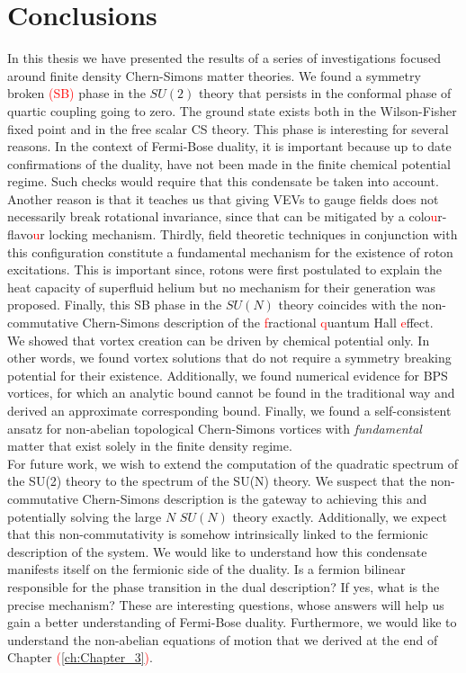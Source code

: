 
\chapter*{Conclusions}

    In this thesis we have presented the results of a series of investigations focused around finite density Chern-Simons matter theories. We found a symmetry broken \textcolor{red}{(SB)} phase in the $SU(2)$ theory that persists in the conformal phase of quartic coupling going to zero. The ground state exists both in the Wilson-Fisher fixed point and in the free scalar CS theory. This phase is interesting for several reasons. In the context of Fermi-Bose duality, it is important because up to date confirmations of the duality, have not been made in the finite chemical potential regime. Such checks would require that this condensate be taken into account. Another reason is that it teaches us that giving VEVs to gauge fields does not necessarily break rotational invariance, since that can be mitigated by a colo\textcolor{red}{u}r-flavo\textcolor{red}{u}r locking mechanism. Thirdly, field theoretic techniques in conjunction with this configuration constitute a fundamental mechanism for the existence of roton excitations. This is important since, rotons were first postulated to explain the heat capacity of superfluid helium \textcolor{red}{\cite{PhysRev.60.356}} but no mechanism for their generation was proposed. Finally, this SB phase in the $SU(N)$ theory coincides with the non-commutative Chern-Simons description of the \textcolor{red}{f}ractional \textcolor{red}{q}uantum Hall \textcolor{red}{e}ffect.\\
    \indent We showed that vortex creation can be driven by chemical potential only. In other words, we found vortex solutions that do not require a symmetry breaking potential for their existence. Additionally, we found numerical evidence for BPS vortices, for which an analytic bound cannot be found in the traditional way and derived an approximate corresponding bound. Finally, we found a self-consistent ansatz for non-abelian topological Chern-Simons vortices with \textit{fundamental} matter that exist solely in the finite density regime.\\
    \indent For future work, we wish to extend the computation of the quadratic spectrum of the SU(2) theory to the spectrum of the SU(N) theory. We suspect that the non-commutative Chern-Simons description is the gateway to achieving this and potentially solving the large $N$ $SU(N)$ theory exactly. Additionally, we expect that this non-commutativity is somehow intrinsically linked to the fermionic description of the system. We would like to understand how this condensate manifests itself on the fermionic side of the duality. Is a fermion bilinear responsible for the phase transition in the dual description? If yes, what is the precise mechanism? These are interesting questions, whose answers will help us gain a better understanding of Fermi-Bose duality. Furthermore, we would like to understand the non-abelian equations of motion that we derived at the end of Chapter \textcolor{red}{(}\ref{ch:Chapter_3}\textcolor{red}{)}.\\
